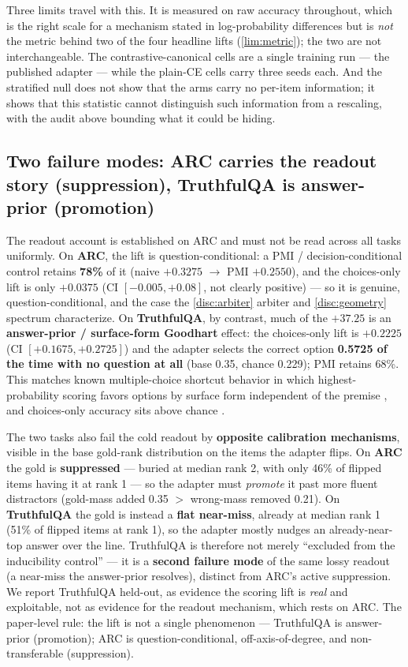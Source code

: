 Three limits travel with this. It is measured on raw accuracy throughout, which is the
right scale for a mechanism stated in log-probability differences but is \emph{not} the
metric behind two of the four headline lifts (\cref{lim:metric}); the two are not
interchangeable. The contrastive-canonical cells are a single training run --- the
published adapter --- while the plain-CE cells carry three seeds each. And the
stratified null does not show that the arms carry no per-item information; it shows
that this statistic cannot distinguish such information from a rescaling, with the
audit above bounding what it could be hiding.

\subsection{Two failure modes: ARC carries the readout story (suppression),
TruthfulQA is answer-prior (promotion)}\label{disc:heterogeneity}

The readout account is established on ARC and must not be read across all tasks
uniformly. On \textbf{ARC}, the lift is question-conditional: a PMI /
decision-conditional control retains \textbf{78\%} of it (naive $+0.3275$
$\rightarrow$ PMI $+0.2550$), and the choices-only lift is only $+0.0375$ (CI
$[-0.005, +0.08]$, not clearly positive) --- so it is genuine,
question-conditional, and the case the \cref{disc:arbiter} arbiter and
\cref{disc:geometry} spectrum characterize. On \textbf{TruthfulQA}, by contrast,
much of the $+37.25$ is an \textbf{answer-prior / surface-form Goodhart} effect:
the choices-only lift is $+0.2225$ (CI $[+0.1675, +0.2725]$) and the adapter
selects the correct option \textbf{0.5725 of the time with no question at all}
(base 0.35, chance 0.229); PMI retains 68\%. This matches known multiple-choice
shortcut behavior in which highest-probability scoring favors options by surface
form independent of the premise \citep{SurfaceFormCompetition}, and choices-only
accuracy sits above chance \citep{ChoicesOnlyCheater}.

The two tasks also fail the cold readout by \textbf{opposite calibration
mechanisms}, visible in the base gold-rank distribution on the items the adapter
flips. On \textbf{ARC} the gold is \textbf{suppressed} --- buried at median rank 2,
with only 46\% of flipped items having it at rank 1 --- so the adapter must
\emph{promote} it past more fluent distractors (gold-mass added 0.35 $>$ wrong-mass
removed 0.21). On \textbf{TruthfulQA} the gold is instead a \textbf{flat
near-miss}, already at median rank 1 (51\% of flipped items at rank 1), so the
adapter mostly nudges an already-near-top answer over the line. TruthfulQA is
therefore not merely ``excluded from the inducibility control'' --- it is a
\textbf{second failure mode} of the same lossy readout (a near-miss the
answer-prior resolves), distinct from ARC's active suppression. We report
TruthfulQA held-out, as evidence the scoring lift is \emph{real} and exploitable,
not as evidence for the readout mechanism, which rests on ARC. The paper-level
rule: the lift is not a single phenomenon --- TruthfulQA is answer-prior
(promotion); ARC is question-conditional, off-axis-of-degree, and non-transferable
(suppression).

